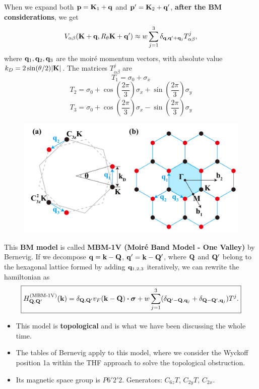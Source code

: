 When we expand both ${\vb{p}} = {\vb{K}}_1 + {\vb{q}}$ and ${\vb{p}}' = {\vb{K}}_2 + {\vb{q}}'$, \textbf{after the BM considerations}, we get
$$
V_{\alpha\beta}({\vb{K}} + {\vb{q}}, R_\theta {\vb{K}} + {\vb{q}}') \approx
w \sum_{j=1}^{3} \delta_{{\vb{q}}, {\vb{q}}' + {\vb{q}}_j} T_{\alpha\beta}^j,
$$
where ${\vb{q}}_1, {\vb{q}}_2, {\vb{q}}_3$ are the moiré momentum vectors, with absolute value $k_D = 2 \sin(\theta/2) \abs{{\vb{K}}}$. The matrices $T^j_{\alpha\beta}$ are
$$
T_1 = \sigma_0 + \sigma_x
$$
$$
T_2 = \sigma_0 + \cos(\frac{2\pi}{3}) \sigma_x + \sin(\frac{2\pi}{3}) \sigma_y
$$
$$
T_3 = \sigma_0 + \cos(\frac{2\pi}{3}) \sigma_x - \sin(\frac{2\pi}{3}) \sigma_y
$$
\begin{figure}[H]
\centering
\includegraphics[width=0.8\linewidth]{fig/moire-vectors.png}
\end{figure}

\n

This \textbf{BM model} is called \textbf{MBM-1V (Moiré Band Model - One Valley)} by Bernevig. If we decompose ${\vb{q}} = {\vb{k}} - {\vb{Q}}$, ${\vb{q}}'={\vb{k}}-{\vb{Q}}'$, where ${\vb{Q}}$ and ${\vb{Q}}'$ belong to the hexagonal lattice formed by adding ${\vb{q}}_{1,2,3}$ iteratively, we can rewrite the hamiltonian as
$$
\boxed{
H_{\Q, \Q'}^{(\text{MBM-1V})}(\k) =
\delta_{\Q,\Q'} v_F (\k-\Q) \vdot \bm{\sigma}
+ w \sum_{j=1}^{3} (\delta_{\Q'-\Q, \q_j} + \delta_{\Q-\Q', \q_j}) T^j.
}
$$

\begin{itemize}
\item This model is \textbf{topological} and is what we have been discussing the whole time.
\item The tables of Bernevig apply to this model, where we consider the Wyckoff position 1a within the THF approach to solve the topological obstruction.
\item Its magnetic space group is $P6'2'2$. Generators: $C_{6z} T$, $C_{2y} T$, $C_{2x}$.
\end{itemize}

